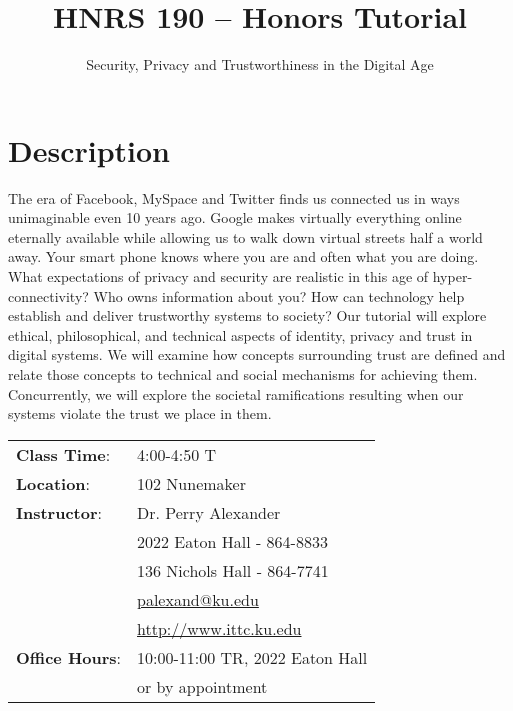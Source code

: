 \documentclass{tufte-handout}
\title{HNRS 190 -- Honors Tutorial}
\author{Security, Privacy and Trustworthiness in the Digital Age}
\begin{document}
\maketitle


\section{Description}
\noindent The era of Facebook, MySpace and Twitter finds us connected
us in ways unimaginable even 10 years ago.  Google makes virtually
everything online eternally available while allowing us to walk down
virtual streets half a world away.  Your  smart phone knows where you
are and often what you are doing.  What expectations of privacy and
security are realistic in this age of hyper-connectivity?  Who owns
information about you?  How can technology help establish and deliver
trustworthy systems to society?  Our tutorial will explore ethical,
philosophical, and technical aspects of identity, privacy and trust in
digital systems.  We will examine how concepts surrounding trust are
defined and relate those concepts to technical and social mechanisms
for achieving them.  Concurrently, we will explore the societal
ramifications resulting when our systems violate the trust we place in
them.


\begin{margintable}
\begin{tabular}{ll}
  \textbf{Class Time}: & 4:00-4:50 T \\
  \textbf{Location}: & 102 Nunemaker \\
  \textbf{Instructor}: & Dr. Perry Alexander \\
  & 2022 Eaton Hall - 864-8833 \\
  & 136 Nichols Hall - 864-7741 \\
  & \url{palexand@ku.edu} \\
  & \url{http://www.ittc.ku.edu} \\
  \textbf{Office Hours}: & 10:00-11:00 TR, 2022 Eaton Hall \\
  & or by appointment \\
\end{tabular}
\end{margintable}
\end{document}
